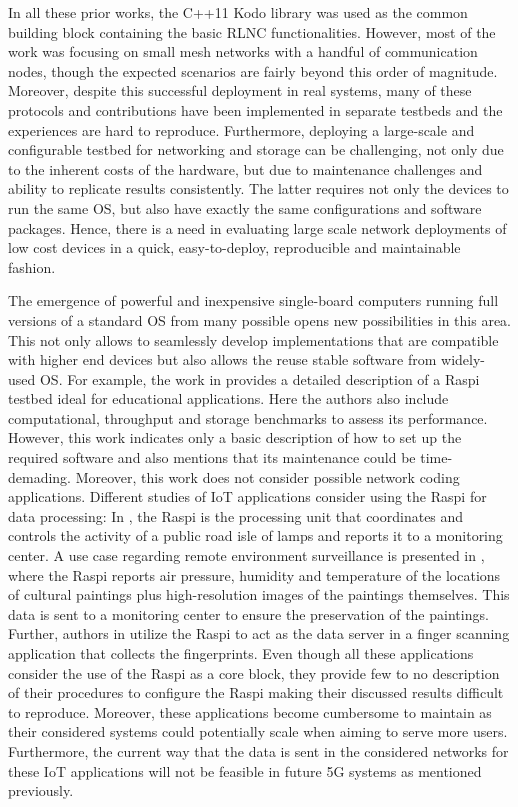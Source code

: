 In all these prior works, the C++11 Kodo library \cite{kodo2011pedersen} was used as the common building block containing the basic \ac{RLNC} functionalities. However, most of the work was focusing on small mesh networks with a handful of communication nodes, though the expected scenarios are fairly beyond this order of magnitude. Moreover, despite this successful deployment in real systems, many of these protocols and contributions have been implemented in separate testbeds and the experiences are hard to reproduce. Furthermore, deploying a large-scale and configurable testbed for networking and storage can be challenging, not only due to the inherent costs of the hardware, but due to maintenance challenges and ability to replicate results consistently. The latter requires not only the devices to run the same \ac{OS}, but also have exactly the same configurations and software packages. Hence, there is a need in evaluating large scale network deployments of low cost devices in a quick, easy-to-deploy, reproducible and maintainable fashion.

The emergence of powerful and inexpensive single-board computers running full versions of a standard \ac{OS} from many possible opens new possibilities in this area. This not only allows to seamlessly develop implementations that are compatible with higher end devices but also allows the reuse stable software from widely-used \ac{OS}. For example, the work in \cite{cox2014iridis} provides a detailed description of a \ac{Raspi}~\cite{making_of_pi} testbed ideal for educational applications. Here the authors also include computational, throughput and storage benchmarks to assess its performance. However, this work indicates only a basic description of how to set up the required software and also mentions that its maintenance could be time-demading. Moreover, this work does not consider possible network coding applications. Different studies of \ac{IoT} applications consider using the \ac{Raspi} for data processing: In \cite{leccese2014smartcity}, the \ac{Raspi} is the processing unit that coordinates and controls the activity of a public road isle of lamps and reports it to a monitoring center. A use case regarding remote environment surveillance is presented in \cite{leccese2014newimaging}, where the \ac{Raspi} reports air pressure, humidity and temperature of the locations of cultural paintings plus high-resolution images of the paintings themselves. This data is sent to a monitoring center to ensure the preservation of the paintings. Further, authors in \cite{sapes2016finger} utilize the \ac{Raspi} to act as the data server in a finger scanning application that collects the fingerprints. Even though all these applications consider the use of the \ac{Raspi} as a core block, they provide few to no description of their procedures to configure the \ac{Raspi} making their discussed results difficult to reproduce. Moreover, these applications become cumbersome to maintain as their considered systems could potentially scale when aiming to serve more users. Furthermore, the current way that the data is sent in the considered networks for these \ac{IoT} applications will not be feasible in future 5G systems as mentioned previously.

